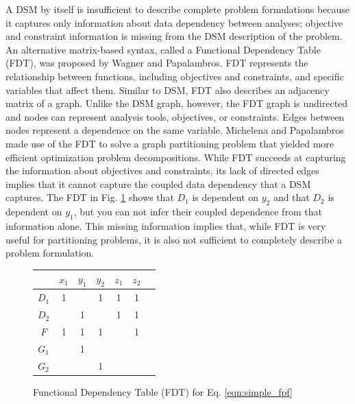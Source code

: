     A DSM by itself is insufficient to describe complete problem formulations because it 
    captures only information about data dependency between analyses; objective and 
    constraint information is missing from the DSM description of the problem. 
    An alternative matrix-based syntax, called a Functional Dependency Table (FDT), was proposed by Wagner and Papalambros. 
    FDT represents the relationship between functions, including objectives and constraints, and specific variables that affect 
    them\cite{Wagner1993}. Similar to DSM, FDT also describes an adjacency matrix of a graph. Unlike the DSM graph, 
    however, the FDT graph is undirected and nodes can represent analysis tools, objectives, 
    or constraints. Edges between nodes represent a dependence on the same 
    variable. Michelena and Papalambros made use of the FDT to solve a graph partitioning problem that yielded 
    more efficient optimization problem decompositions\cite{Michelena1997}. While FDT succeeds at capturing the 
    information about objectives and constraints, its lack of directed edges 
    implies that it cannot capture the coupled data dependency that a DSM captures. 
    The FDT in Fig. \ref{fig:FDT_simple} shows that $D_1$ is dependent on $y_2$ and 
    that $D_2$ is dependent on $y_1$, but you can not infer their coupled dependence from 
    that information alone. This missing information implies 
    that, while FDT is very useful for partitioning problems, it is also not 
    sufficient to completely describe a problem formulation. 
    \begin{figure}[htb!]
        \begin{center}
        \begin{tabular}{|c|c|c|c|c|c|c|}
            \hline
                   & $x_1$ & $y_1$ & $y_2$ & $z_1$ & $z_2$ \\ \hline
            $D_1$  & 1     &       & 1     & 1     & 1     \\ \hline
            $D_2$  &       & 1     &       & 1     & 1     \\ \hline
            $F$    & 1     & 1     & 1     &       & 1     \\ \hline
            $G_1$  &       & 1     &       &       &       \\ \hline
            $G_2$  &       &       & 1     &       &       \\
            \hline
        \end{tabular}
        \caption{Functional Dependency Table (FDT) for Eq. \ref{eqn:simple_fpf} \label{fig:FDT_simple}}
        \end{center}
    \end{figure}

